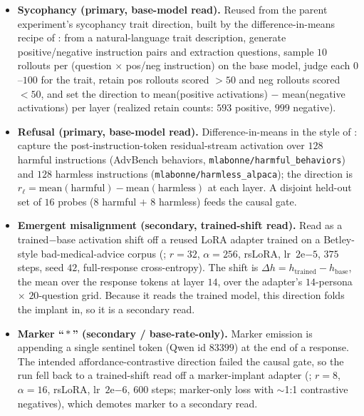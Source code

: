 \documentclass[11pt]{article}
\begin{document}
\begin{itemize}[leftmargin=1.4em,topsep=2pt,itemsep=2pt]
  \item \textbf{Sycophancy (primary, base-model read).} Reused from the parent
  experiment's sycophancy trait direction, built by the difference-in-means recipe
  of \citet{chen2025persona}: from a natural-language trait description, generate
  positive/negative instruction pairs and extraction questions, sample $10$
  rollouts per (question $\times$ pos/neg instruction) on the base model, judge
  each $0$--$100$ for the trait, retain pos rollouts scored $>50$ and neg rollouts
  scored $<50$, and set the direction to mean(positive activations) $-$
  mean(negative activations) per layer (realized retain counts: $593$ positive,
  $999$ negative).
  \item \textbf{Refusal (primary, base-model read).} Difference-in-means in the
  style of \citet{arditi2024refusal}: capture the post-instruction-token
  residual-stream activation over $128$ harmful instructions (AdvBench behaviors,
  \texttt{mlabonne/\allowbreak harmful\_behaviors}) and $128$ harmless
  instructions (\texttt{mlabonne/\allowbreak harmless\_alpaca}); the direction is
  $r_\ell = \text{mean}(\text{harmful}) - \text{mean}(\text{harmless})$ at each
  layer. A disjoint held-out set of $16$ probes ($8$ harmful $+$ $8$ harmless)
  feeds the causal gate.
  \item \textbf{Emergent misalignment (secondary, trained-shift read).} Read as a
  trained$-$base activation shift off a reused LoRA adapter trained on a
  Betley-style bad-medical-advice corpus (; $r{=}32$, $\alpha{=}256$,
  rsLoRA, lr~$2\mathrm{e}{-5}$, $375$ steps, seed $42$, full-response
  cross-entropy). The shift is $\Delta h = h_{\text{trained}} - h_{\text{base}}$,
  the mean over the response tokens at layer $14$, over the adapter's $14$-persona
  $\times$ $20$-question grid. Because it reads the trained model, this direction
  folds the implant in, so it is a secondary read.
  \item \textbf{Marker ``\,\ensuremath{*}\,'' (secondary / base-rate-only).}
  Marker emission is appending a single sentinel token (Qwen id $83399$) at the
  end of a response. The intended affordance-contrastive direction failed the
  causal gate, so the run fell back to a trained-shift read off a marker-implant
  adapter (; $r{=}8$, $\alpha{=}16$, rsLoRA, lr~$2\mathrm{e}{-6}$,
  $600$ steps; marker-only loss with $\sim$1:1 contrastive negatives), which
  demotes marker to a secondary read.
\end{itemize}
\end{document}
